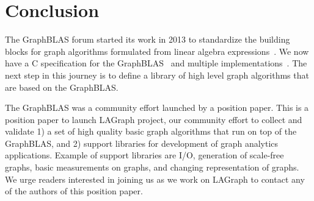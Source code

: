 \section{Conclusion}
\label{sec:conclusion}

The GraphBLAS forum started its work in 2013 to standardize the building blocks for 
graph algorithms formulated from linear algebra expressions~\cite{hpec13}.  We now
have a C specification for the GraphBLAS~\cite{cspec} and multiple 
implementations~\cite{Davis19,GPI,gbtl-github}.   The next 
step in this journey is to define a library of high level graph algorithms
that are based on the GraphBLAS.  

The GraphBLAS was a community effort launched by a position paper.
This is a position paper to launch LAGraph project, our community effort to 
collect and validate 1) a set of high quality basic graph algorithms that run 
on top of the GraphBLAS, and 2) support libraries for development of graph analytics 
applications.  Example of support libraries are I/O, generation of scale-free graphs,
basic measurements on graphs, and changing representation of graphs.  
We urge readers interested in joining us as we
work on LAGraph to contact any of the authors of this position paper.


